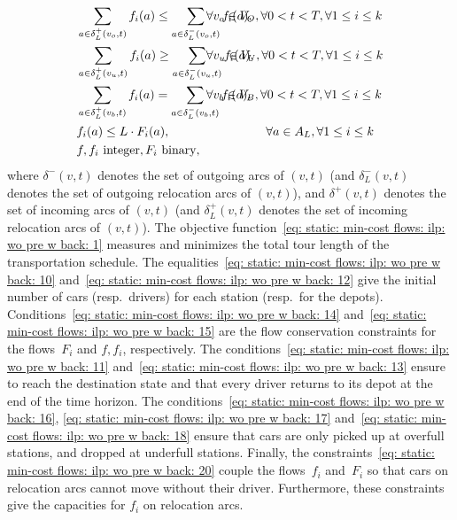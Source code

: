 \documentclass[english]{llncs}
\numberwithin{sublemma}{lemma}
\newcommand{\capd}{\ensuremath{L}}
\newcommand{\fc}{\ensuremath{f}}
\newcommand{\fd}{\ensuremath{F}}
\begin{document}
\begin{subequations}
\begin{flalign}
& \sum_{a \in \delta^+_L(v_o, t)} \fc_i(a) \leq \sum_{a \in \delta^-_L(v_o, t)} \fc_i(a), && \hspace{-1.7cm}  \forall v_o \in V_O, \forall 0 < t < T, \forall 1 \leq i \leq k \label{eq: static: min-cost flows: ilp: wo pre w back: 16} \\
    & \sum_{a \in \delta^+_L(v_u, t)} \fc_i(a) \geq \sum_{a \in \delta^-_L(v_u, t)} \fc_i(a), && \hspace{-1.7cm}  \forall v_u \in V_U, \forall 0 < t < T, \forall 1 \leq i \leq k \label{eq: static: min-cost flows: ilp: wo pre w back: 17} \\
    & \sum_{a \in \delta^+_L(v_b, t)} \fc_i(a) = \sum_{a \in \delta^-_L(v_b, t)} \fc_i(a),    && \hspace{-1.7cm}  \forall v_b \in V_B, \forall 0 < t < T, \forall 1 \leq i \leq k \label{eq: static: min-cost flows: ilp: wo pre w back: 18} \\
& \fc_i(a) \leq \capd \cdot \fd_i(a),                                                        && \forall a \in A_L, \forall 1 \leq i \leq k                  \label{eq: static: min-cost flows: ilp: wo pre w back: 20}\\
    & \fc, \fc_i \text{ integer}, \fd_i \text{ binary},          \label{eq: static: min-cost flows: wo pre w back: ilp: 21}
  \end{flalign}
\end{subequations}
where $\delta^-(v,t)$ denotes the set of outgoing arcs of $(v,t)$ (and $\delta^-_L(v,t)$ denotes the set of outgoing relocation arcs of $(v,t)$),
and $\delta^+(v,t)$ denotes the set of incoming arcs of $(v,t)$ (and $\delta^+_L(v,t)$ denotes the set of incoming relocation arcs of $(v,t)$). 
The objective function~\eqref{eq: static: min-cost flows: ilp: wo pre w back: 1} measures and minimizes the total tour length of the transportation schedule.
The equalities~\eqref{eq: static: min-cost flows: ilp: wo pre w back: 10} and~\eqref{eq: static: min-cost flows: ilp: wo pre w back: 12} give the initial number of cars (resp.~drivers) for each station (resp.~for the depots).
Conditions~\eqref{eq: static: min-cost flows: ilp: wo pre w back: 14} and~\eqref{eq: static: min-cost flows: ilp: wo pre w back: 15} are the flow conservation constraints for the flows~$\fd_i$ and $\fc, \fc_i$, respectively.
The conditions~\eqref{eq: static: min-cost flows: ilp: wo pre w back: 11} and~\eqref{eq: static: min-cost flows: ilp: wo pre w back: 13} ensure to reach the destination state
and that every driver returns to its depot at the end of the time horizon.
The conditions~\eqref{eq: static: min-cost flows: ilp: wo pre w back: 16}, \eqref{eq: static: min-cost flows: ilp: wo pre w back: 17} and~\eqref{eq: static: min-cost flows: ilp: wo pre w back: 18}
ensure that cars are only picked up at overfull stations, and dropped at underfull stations.
Finally, the constraints~\eqref{eq: static: min-cost flows: ilp: wo pre w back: 20} couple the flows~$\fc_i$ and~$\fd_i$ so that cars on relocation arcs cannot move without their driver.
Furthermore, these constraints give the capacities for $\fc_i$ on relocation arcs.
\end{document}
